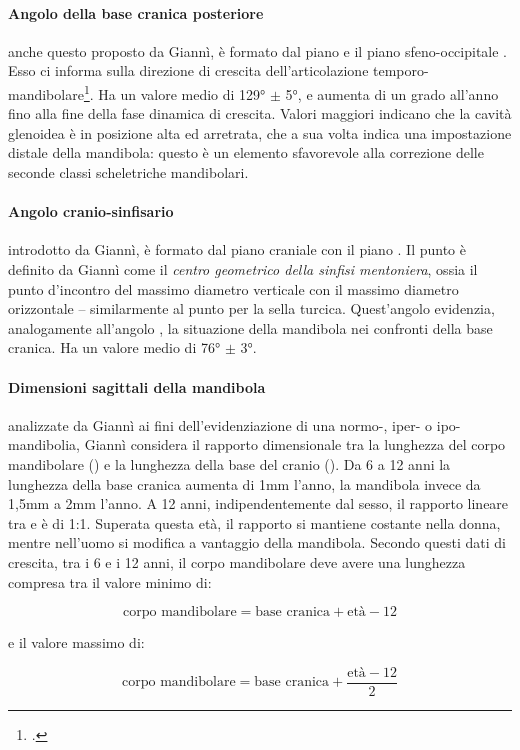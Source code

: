 \paragraph{Angolo della base cranica posteriore} anche questo proposto da Giannì, è formato dal piano  e il piano sfeno-occipitale . Esso ci informa sulla direzione di crescita dell'articolazione temporo-mandibolare\footcite{Ricketts1960}. Ha un valore medio di 129° $\pm$ 5°, e aumenta di un grado all'anno fino alla fine della fase dinamica di crescita. Valori maggiori indicano che la cavità glenoidea è in posizione alta ed arretrata, che a sua volta indica una impostazione distale della mandibola: questo è un elemento sfavorevole alla correzione delle seconde classi scheletriche mandibolari.

\paragraph{Angolo cranio-sinfisario} introdotto da Giannì, è formato dal piano craniale  con il piano . Il punto  è definito da Giannì come il \textit{centro geometrico della sinfisi mentoniera}, ossia il punto d'incontro del massimo diametro verticale con il massimo diametro orizzontale -- similarmente al punto  per la sella turcica. Quest'angolo evidenzia, analogamente all'angolo , la situazione della mandibola nei confronti della base cranica. Ha un valore medio di 76° $\pm$ 3°.

\paragraph{Dimensioni sagittali della mandibola} \label{sec:giannì_mandibola} analizzate da Giannì ai fini dell'evidenziazione di una normo-, iper- o ipo-mandibolia, Giannì considera il rapporto dimensionale tra la lunghezza del corpo mandibolare () e la lunghezza della base del cranio (). Da 6 a 12 anni la lunghezza della base cranica aumenta di 1mm l'anno, la mandibola invece da 1,5mm a 2mm l'anno. A 12 anni, indipendentemente dal sesso, il rapporto lineare tra  e  è di 1:1. Superata questa età, il rapporto si mantiene costante nella donna, mentre nell'uomo si modifica a vantaggio della mandibola. Secondo questi dati di crescita, tra i 6 e i 12 anni, il corpo mandibolare deve avere una lunghezza compresa tra il valore minimo di:
\begin{singlespace}
\[ \text{corpo mandibolare} = \text{base cranica} + \text{età} - 12 \]
\end{singlespace}
e il valore massimo di:
\begin{singlespace}
\[ \text{corpo mandibolare} = \text{base cranica} + \frac{\text{età} - 12}{2} \]
\end{singlespace}

